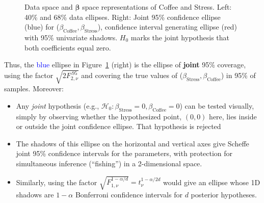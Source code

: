 \documentclass[
  letterpaper,
  10pt,
  krantz2]{krantz}
\providecommand{\tightlist}{%
  \setlength{\itemsep}{0pt}\setlength{\parskip}{0pt}}\usepackage{longtable,booktabs,array}
\begin{document}
\begin{figure}


\caption{\label{fig-coffee-data-beta-both}Data space and
\(\mathbf{\beta}\) space representations of Coffee and Stress. Left:
40\% and 68\% data ellipses. Right: Joint 95\% confidence ellipse (blue)
for (\(\beta_{\text{Coffee}}, \beta_{\text{Stress}}\)), confidence
interval generating ellipse (red) with 95\% univariate shadows. \(H_0\)
marks the joint hypothesis that both coefficients equal zero.}

\end{figure}%

Thus, the \textcolor{blue}{blue} ellipse in
Figure~\ref{fig-coffee-data-beta-both} (right) is the ellipse of
\textbf{joint} 95\% coverage, using the factor
\(\sqrt{2 F^{.95}_{2, \nu}}\) and covering the true values of
(\(\beta_{\mathrm{Stress}}, \beta_{\mathrm{Coffee}}\)) in 95\% of
samples. Moreover:

\begin{itemize}
\tightlist
\item
  Any \emph{joint} hypothesis (e.g.,
  \(\mathcal{H}_0:\beta_{\mathrm{Stress}}=0, \beta_{\mathrm{Coffee}}=0\))
  can be tested visually, simply by observing whether the hypothesized
  point, \((0, 0)\) here, lies inside or outside the joint confidence
  ellipse. That hypothesis is rejected
\item
  The shadows of this ellipse on the horizontal and vertical axes give
  Scheff\textquotesingle e joint 95\% confidence intervals for the
  parameters, with protection for simultaneous inference (``fishing'')
  in a 2-dimensional space.
\item
  Similarly, using the factor
  \(\sqrt{F^{1-\alpha/d}_{1, \nu}} = t^{1-\alpha/2d}_\nu\) would give an
  ellipse whose 1D shadows are \(1-\alpha\) Bonferroni confidence
  intervals for \(d\) posterior hypotheses.
\end{itemize}
\end{document}
